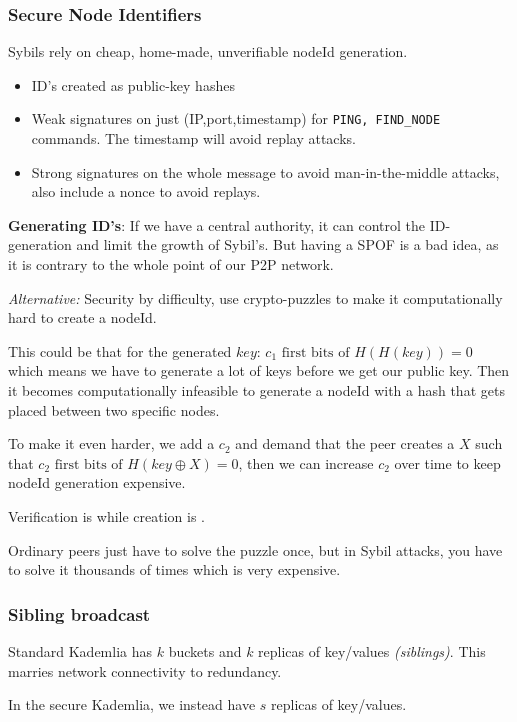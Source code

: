 	\subsubsection{Secure Node Identifiers}
	Sybils rely on cheap, home-made, unverifiable nodeId generation.
	\begin{itemize}
		\item ID's created as public-key hashes
		\item Weak signatures on just (IP,port,timestamp) for \texttt{PING, FIND\_NODE} commands.
		The timestamp will avoid replay attacks.
		
		\item Strong signatures on the whole message to avoid man-in-the-middle attacks, also include a nonce to avoid replays.
	\end{itemize}
	
	\textbf{Generating ID's}: If we have a central authority, it can control the ID-generation and limit the growth of Sybil's. But having a \gls{SPOF} is a bad idea, as it is contrary to the whole point of our \gls{P2P} network.
	
	\textit{Alternative:} Security by difficulty, use crypto-puzzles to make it computationally hard to create a nodeId. 
	
	This could be that for the generated $key$: $c_1 \text{ first bits of } H(H(key)) = 0$ which means we have to generate a lot of keys before we get our public key. Then it becomes computationally infeasible to generate a nodeId with a hash that gets placed between two specific nodes.
	
	To make it even harder, we add a $c_2$ and demand that the peer creates a $X$ such that  $c_2 \text{ first bits of } H(key \oplus X) = 0$, then we can increase $c_2$ over time to keep nodeId generation expensive.
	
	Verification is  while creation is .

	Ordinary peers just have to solve the puzzle once, but in Sybil attacks, you have to solve it thousands of times which is very expensive.
	
	\subsubsection{Sibling broadcast}
	Standard Kademlia has $k$ buckets and $k$ replicas of key/values \textit{(siblings)}. This marries network connectivity to redundancy.

	In the secure Kademlia, we instead have $s$ replicas of key/values.
	
